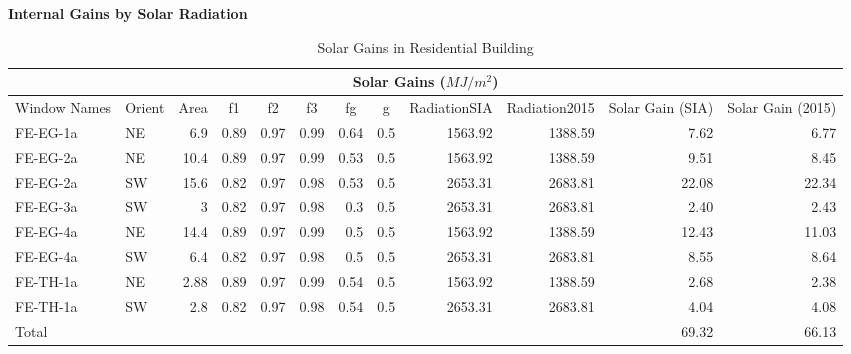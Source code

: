 \documentclass[11pt, a4paper]{article}
\theoremstyle{definition}
\begin{document}
		\textbf{Internal Gains by Solar Radiation}\\
		\begin{table}[htbp]
		\centering
		\small
		\caption{Solar Gains in Residential Building}
		    \begin{tabular}{lrrrrrrrrrrr}
		    \toprule
		    \multicolumn{12}{c}{Solar Gains ($MJ/m^2$)} \\
		    \midrule
		    \multicolumn{1}{p{4.215em}}{Window Names} & \multicolumn{1}{c}{Orient} & \multicolumn{1}{c}{Area} & \multicolumn{1}{c}{f1} & \multicolumn{1}{c}{f2} & \multicolumn{1}{c}{f3} & \multicolumn{1}{c}{fg} & \multicolumn{1}{c}{g} & \multicolumn{1}{p{4.57em}}{Radiation\newline{}SIA} & \multicolumn{1}{p{4.57em}}{Radiation\newline{}2015} & \multicolumn{1}{p{3.8em}}{Solar Gain (SIA)} & \multicolumn{1}{p{3.8em}}{Solar Gain (2015)} \\
		    \midrule
		    FE-EG-1a & \multicolumn{1}{l}{NE} & 6.9   & 0.89  & 0.97  & 0.99  & 0.64  & 0.5   & 1563.92 & 1388.59 & 7.62  & 6.77 \\
		    FE-EG-2a & \multicolumn{1}{l}{NE} & 10.4  & 0.89  & 0.97  & 0.99  & 0.53  & 0.5   & 1563.92 & 1388.59 & 9.51  & 8.45 \\
		    FE-EG-2a & \multicolumn{1}{l}{SW} & 15.6  & 0.82  & 0.97  & 0.98  & 0.53  & 0.5   & 2653.31 & 2683.81 & 22.08 & 22.34 \\
		    FE-EG-3a & \multicolumn{1}{l}{SW} & 3     & 0.82  & 0.97  & 0.98  & 0.3   & 0.5   & 2653.31 & 2683.81 & 2.40  & 2.43 \\
		    FE-EG-4a & \multicolumn{1}{l}{NE} & 14.4  & 0.89  & 0.97  & 0.99  & 0.5   & 0.5   & 1563.92 & 1388.59 & 12.43 & 11.03 \\
		    FE-EG-4a & \multicolumn{1}{l}{SW} & 6.4   & 0.82  & 0.97  & 0.98  & 0.5   & 0.5   & 2653.31 & 2683.81 & 8.55  & 8.64 \\
		    FE-TH-1a & \multicolumn{1}{l}{NE} & 2.88  & 0.89  & 0.97  & 0.99  & 0.54  & 0.5   & 1563.92 & 1388.59 & 2.68  & 2.38 \\
		    FE-TH-1a & \multicolumn{1}{l}{SW} & 2.8   & 0.82  & 0.97  & 0.98  & 0.54  & 0.5   & 2653.31 & 2683.81 & 4.04  & 4.08 \\
		    \midrule
		    Total &       &       &       &       &       &       &       &       &       & 69.32 & 66.13 \\
		    \bottomrule
		    \end{tabular}%
		  \label{tab:HonggSolarGain}%
		\end{table}%
\end{document}

